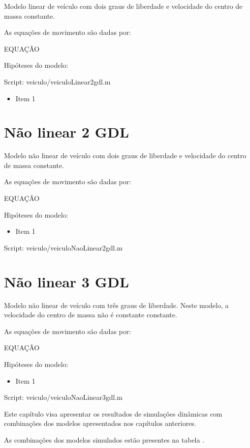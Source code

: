 \documentclass[sublist]{fei}
\begin{document}
Modelo linear de veículo com dois graus de liberdade e velocidade do centro de massa constante.

As equações de movimento são dadas por:

EQUAÇÃO

Hipóteses do modelo:


Script: veiculo/veiculoLinear2gdl.m

\begin{itemize}
\item Item 1
\end{itemize}

\section{Não linear 2 GDL}

Modelo não linear de veículo com dois graus de liberdade e velocidade do centro de massa constante.

As equações de movimento são dadas por:

EQUAÇÃO

Hipóteses do modelo:

\begin{itemize}
\item Item 1
\end{itemize}



Script: veiculo/veiculoNaoLinear2gdl.m


\section{Não linear 3 GDL}


Modelo não linear de veículo com três graus de liberdade. Neste modelo, a velocidade do centro de massa não é constante constante.

As equações de movimento são dadas por:

EQUAÇÃO

Hipóteses do modelo:

\begin{itemize}
\item Item 1
\end{itemize}

Script: veiculo/veiculoNaoLinear3gdl.m



Este capítulo visa apresentar os resultados de simulações dinâmicas com combinações dos modelos apresentados nos capítulos anteriores.

As combinações dos modelos simulados estão presentes na tabela .
\end{document}
